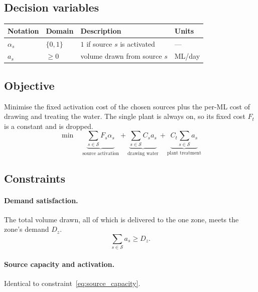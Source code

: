 \documentclass[10pt]{article}
\begin{document}
\subsection{Decision variables}
\begin{center}
    \begin{tabular}{@{}llll@{}}
        \toprule
        \textbf{Notation} & \textbf{Domain} & \textbf{Description}           & \textbf{Units} \\
        \midrule
        $\alpha_{s}$      & $\{0,1\}$       & $1$ if source $s$ is activated & ---            \\
        $a_{s}$           & $\ge 0$         & volume drawn from source $s$   & ML/day         \\
        \bottomrule
    \end{tabular}
\end{center}

\subsection{Objective}
Minimise the fixed activation cost of the chosen sources plus the per-ML cost of drawing
and treating the water. The single plant is always on, so its fixed cost $F_t$ is a constant and is dropped.
\begin{equation}
    \min \quad
    \underbrace{\sum_{s \in \mathcal{S}} F_s \alpha_s}_{\text{source activation}}
    + \underbrace{\sum_{s \in \mathcal{S}} C_s a_s}_{\text{drawing water}}
    + \underbrace{C_t\sum_{s \in \mathcal{S}} a_s}_{\text{plant treatment}}
\end{equation}

\subsection{Constraints}
\paragraph{Demand satisfaction.} The total volume drawn, all of which is delivered to the one zone, meets the zone's demand $D_{z}$.
\begin{equation}
    \sum_{s \in \mathcal{S}} a_s \ge D_{z}.
\end{equation}

\paragraph{Source capacity and activation.} Identical to constraint~\eqref{eq:source_capacity}.
\end{document}
